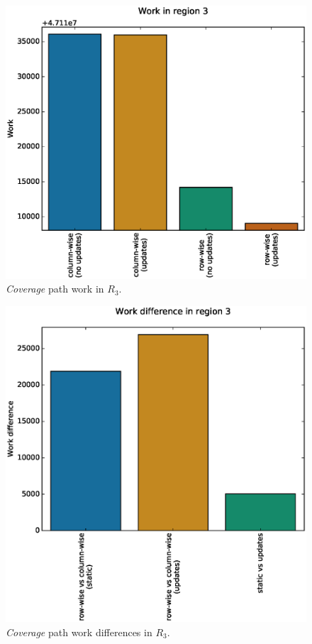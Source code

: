 \documentclass{tamuccthesis}
\begin{document}
\begin{figure}
    \captionsetup{justification=centering}
    \centering
    \includegraphics[width=\textwidth,trim={0cm 0cm 0cm 0.75cm},clip]{work_r3.eps}
    \caption{\textit{Coverage} path work in $R_3$.}
    \label{fig:coverage_noterrain_work_r3}
\end{figure}
\begin{figure}
    \captionsetup{justification=centering}
    \centering
    \includegraphics[width=\textwidth,trim={0cm 0cm 0cm 0.75cm},clip]{diff_r3.eps}
    \caption{\textit{Coverage} path work differences in $R_3$.}
    \label{fig:coverage_noterrain_diff_r3}
\end{figure}
\end{document}
